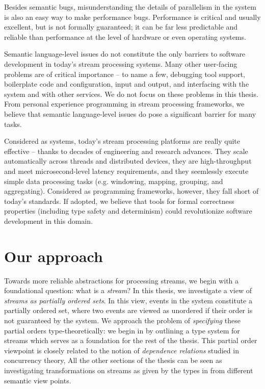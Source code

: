 Besides semantic bugs, misunderstanding the details of parallelism in the system is also an easy way to make performance bugs. Performance is critical and usually excellent, but is not formally guaranteed; it can be far less predictable and reliable than performance at the level of hardware or even operating systems.

Semantic language-level issues do not constitute the only barriers to software development in today's stream processing systems. Many other user-facing problems are of critical importance -- to name a few, debugging tool support, boilerplate code and configuration, input and output, and interfacing with the system and with other services. We do not focus on these problems in this thesis. From personal experience programming in stream processing frameworks, we believe that semantic language-level issues do pose a significant barrier for many tasks.

Considered as systems, today's stream processing platforms are really quite effective -- thanks to decades of engineering and research advances. They scale automatically across threads and distributed devices, they are high-throughput and meet microsecond-level latency requirements, and they seemlessly execute simple data processing tasks (e.g. windowing, mapping, grouping, and aggregating). Considered as programming frameworks, however, they fall short of today's standards. If adopted, we believe that tools for formal correctness properties (including type safety and determinism) could revolutionize software development in this domain.

\section{Our approach}

Towards more reliable abstractions for processing streams, we begin with a foundational question: what is a \emph{stream}?
In this thesis, we investigate a view of \emph{streams as partially ordered sets}.
In this view, events in the system constitute a partially ordered set,
where two events are viewed as unordered if their order
is not guaranteed by the system.
We approach the problem of \emph{specifying} these partial orders type-theoretically: we begin in  by
outlining a type system for streams which serves as a foundation for the rest of the thesis.
This partial order viewpoint is closely related to the notion of \emph{dependence relations} studied in concurrency theory,
All the other sections of the thesis can be seen as investigating transformations on streams as given by the types in  from different semantic view points.

